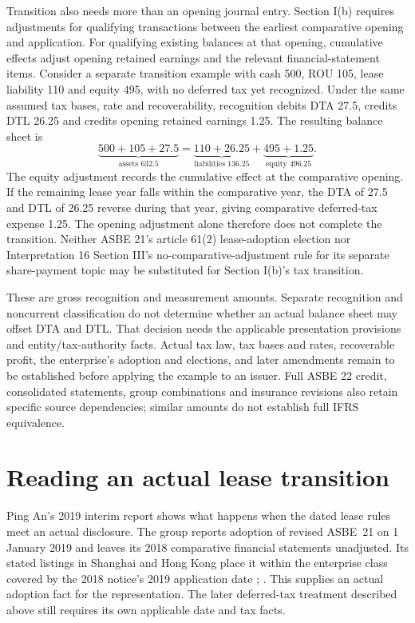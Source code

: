 Transition also needs more than an opening journal entry. Section I(b) requires adjustments for qualifying transactions between the earliest comparative opening and application. For qualifying existing balances at that opening, cumulative effects adjust opening retained earnings and the relevant financial-statement items. Consider a separate transition example with cash 500, ROU 105, lease liability 110 and equity 495, with no deferred tax yet recognized. Under the same assumed tax bases, rate and recoverability, recognition debits DTA 27.5, credits DTL 26.25 and credits opening retained earnings 1.25. The resulting balance sheet is
\[
\underbrace{500+105+27.5}_{\text{assets }632.5}
=\underbrace{110+26.25}_{\text{liabilities }136.25}
+\underbrace{495+1.25}_{\text{equity }496.25}.
\]
The equity adjustment records the cumulative effect at the comparative opening. If the remaining lease year falls within the comparative year, the DTA of 27.5 and DTL of 26.25 reverse during that year, giving comparative deferred-tax expense 1.25. The opening adjustment alone therefore does not complete the transition. Neither ASBE 21's article 61(2) lease-adoption election nor Interpretation 16 Section III's no-comparative-adjustment rule for its separate share-payment topic may be substituted for Section I(b)'s tax transition.

These are gross recognition and measurement amounts. Separate recognition and noncurrent classification do not determine whether an actual balance sheet may offset DTA and DTL. That decision needs the applicable presentation provisions and entity/tax-authority facts. Actual tax law, tax bases and rates, recoverable profit, the enterprise's adoption and elections, and later amendments remain to be established before applying the example to an issuer. Full ASBE 22 credit, consolidated statements, group combinations and insurance revisions also retain specific source dependencies; similar amounts do not establish full IFRS equivalence.

\clearpage
\section{Reading an actual lease transition}
\label{sec:pingan-lease-transition}

Ping An's 2019 interim report shows what happens when the dated lease rules
meet an actual disclosure. The group reports adoption of revised ASBE~21 on
1 January 2019 and leaves its 2018 comparative financial statements
unadjusted. Its stated listings in Shanghai and Hong Kong place it within
the enterprise class covered by the 2018 notice's 2019 application date
\citep[pp.\ 112--113]{pingan2019asbe};
\citep[notice, para.\ I]{moflease2018}. This supplies an actual adoption
fact for the representation. The later deferred-tax treatment described
above still requires its own applicable date and tax facts.

